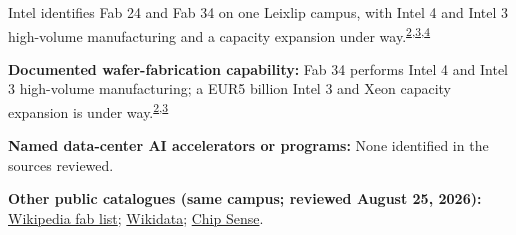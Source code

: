 \begin{minipage}[t][0.90\textheight][t]{\textwidth}
\begin{minipage}[t]{\textwidth}
\begin{minipage}[t]{0.32\textwidth}
\medskip
{\footnotesize Intel identifies Fab 24 and Fab 34 on one Leixlip campus, with Intel 4 and Intel 3 high-volume manufacturing and a capacity expansion under way.\nobreak\textsuperscript{\href{\detokenize{https://www.intc.com/filings-reports/all-sec-filings/content/0000050863-26-000011/intc-20251227.htm}}{\textcolor{accent}{2}},\href{\detokenize{https://web.archive.org/web/20260814012648/https://newsroom.intel.com/intel-foundry/intel-invests-5-billion-euro-to-expand-manufacturing-in-europe}}{\textcolor{accent}{3}},\href{\detokenize{https://leap.epa.ie/docs/81d5494a-236b-437f-b142-5afa039042a4.pdf}}{\textcolor{accent}{4}}}\par}
\medskip
{\footnotesize\textbf{Documented wafer-fabrication capability:} Fab 34 performs Intel 4 and Intel 3 high-volume manufacturing; a EUR5 billion Intel 3 and Xeon capacity expansion is under way.\nobreak\textsuperscript{\href{\detokenize{https://www.intc.com/filings-reports/all-sec-filings/content/0000050863-26-000011/intc-20251227.htm}}{\textcolor{accent}{2}},\href{\detokenize{https://web.archive.org/web/20260814012648/https://newsroom.intel.com/intel-foundry/intel-invests-5-billion-euro-to-expand-manufacturing-in-europe}}{\textcolor{accent}{3}}}\par}
\end{minipage}
\end{minipage}
\par\vspace{0.65em}
\medskip
{\footnotesize\textbf{Named data-center AI accelerators or programs:} None identified in the sources reviewed.\par}
\smallskip
{\sffamily\scriptsize\color{black!62}\textbf{Other public catalogues (same campus; reviewed August 25, 2026):} \href{\detokenize{https://en.wikipedia.org/w/index.php?title=List_of_semiconductor_fabrication_plants&oldid=1370451124}\#\detokenize{Open_plants}}{Wikipedia fab list}; \href{\detokenize{https://www.wikidata.org/w/index.php?title=Q113324961&oldid=1694261236}}{Wikidata}; \href{\detokenize{https://github.com/aminalav/chip-sense/blob/93d22afe9e1309a7bebd6c7c96541f069f1d67ac/src/data/fab-sites.json}\#\detokenize{L153-L160}}{Chip Sense}.\par}
\medskip

\end{minipage}
